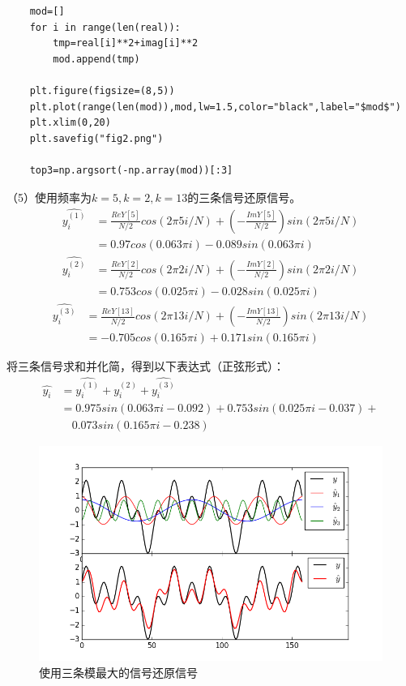 \documentclass[12pt,a4paper,onecolumn]{article}
\begin{document}
\begin{lstlisting}
	mod=[]
	for i in range(len(real)):
	    tmp=real[i]**2+imag[i]**2
	    mod.append(tmp)

	plt.figure(figsize=(8,5))
	plt.plot(range(len(mod)),mod,lw=1.5,color="black",label="$mod$")
	plt.xlim(0,20)
	plt.savefig("fig2.png")

	top3=np.argsort(-np.array(mod))[:3]
\end{lstlisting}

（5）使用频率为$k=5,k=2,k=13$的三条信号还原信号。
\begin{align*}
	\hat{y^{(1)}_i} &=\frac{ReY[5]}{N/2}cos(2\pi 5i/N)+(-\frac{ImY[5]}{N/2})sin(2\pi 5i/N) \\
	              &=0.97cos(0.063\pi i)-0.089sin(0.063\pi i)
\end{align*}
\begin{align*}
	\hat{y^{(2)}_i} &=\frac{ReY[2]}{N/2}cos(2\pi 2i/N)+(-\frac{ImY[2]}{N/2})sin(2\pi 2i/N) \\
	              &=0.753cos(0.025\pi i)-0.028sin(0.025\pi i)
\end{align*}
\begin{align*}
	\hat{y^{(3)}_i} &=\frac{ReY[13]}{N/2}cos(2\pi 13i/N)+(-\frac{ImY[13]}{N/2})sin(2\pi 13i/N) \\
	              &=-0.705cos(0.165\pi i)+0.171sin(0.165\pi i)
\end{align*}

将三条信号求和并化简，得到以下表达式（正弦形式）：
\begin{align*}
	\hat{y_i} &=\hat{y^{(1)}_i}+\hat{y^{(2)}_i}+\hat{y^{(3)}_i} \\
	          &=0.975sin(0.063\pi i-0.092)+0.753sin(0.025\pi i-0.037)+\\
	          &\quad 0.073sin(0.165\pi i-0.238)
\end{align*}

\begin{figure}[H]
	\centering
	\includegraphics[width=400pt]{fig3.png}
	\caption{使用三条模最大的信号还原信号}
\end{figure}
\end{document}
